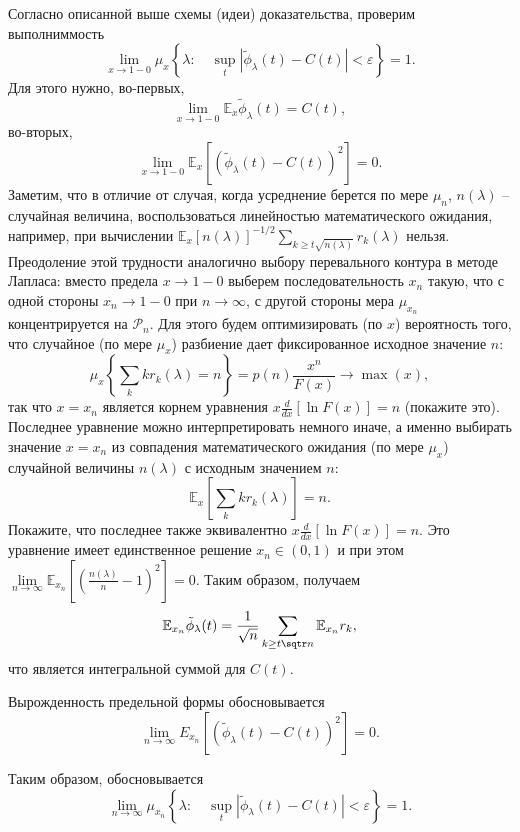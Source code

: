 \begin{problem}
\begin{ordre}
Согласно описанной выше схемы (идеи) доказательства, проверим выполниммость
$$\mathop {\lim }\limits_{x\to 1-0} \mu_{x} \left\{ {\lambda :\quad \mathop {\sup }\limits_t \left| {\tilde {\phi }_\lambda (t)-C(t)} 
\right|<\varepsilon } \right\}=1.$$
Для этого нужно, во-первых,
$$
\mathop {\lim }\limits_{x\to 1-0} \mathbb E_{x}\tilde {\phi }_\lambda (t)=C(t),
$$
во-вторых,
$$\mathop {\lim }\limits_{x\to 
1-0 } \mathbb E_{x } \left[ {\left( {\tilde {\phi }_\lambda (t)-C(t)} 
\right)^2} \right]=0.$$
Заметим, что в отличие от случая, когда усреднение берется по мере $\mu_n$, $n(\lambda)$ -- случайная величина, воспользоваться линейностью математического ожидания, например, при вычислении $\mathbb E_x [n(\lambda)]^{-1/2} \sum_{k\ge t\sqrt {n(\lambda)}} r_k(\lambda)$ нельзя. Преодоление этой трудности аналогично выбору перевального контура в методе Лапласа: вместо предела $x\to 1-0$ выберем последовательность $x_n$ такую, что с одной стороны $x_n \to 1-0$ при ${n\to\infty}$, с другой стороны мера $\mu_{x_n}$ концентрируется на  $\mathcal P_n$. Для этого будем оптимизировать (по $x$) вероятность того, что случайное (по мере $\mu_x$) разбиение дает фиксированное исходное значение $n$:
$$ \mu_{x} \left\{ \sum_k kr_k(\lambda) = n \right \} = p(n)\frac{x^n}{F(x)}\to\max(x), $$
так что  $x=x_n$ является корнем уравнения
$x\frac{d}{dx}\left[ {\ln 
F(x)} \right]=n$ (покажите это).
Последнее уравнение можно интерпретировать немного иначе, а именно выбирать значение $x=x_n$ из совпадения математического ожидания (по мере $\mu_x$) случайной величины $n(\lambda)$ с исходным значением $n$:
$$ \mathbb E_x \left[ {\sum\limits_k {kr_k (\lambda )} } 
\right]=n. $$
Покажите, что последнее также эквивалентно $x\frac{d}{dx}\left[ {\ln 
F(x)} \right]=n$. Это уравнение имеет единственное решение $x_n \in (0,1)$ и 
при этом $\mathop {\lim }\limits_{n\to \infty } \mathbb E_{x_n } \left[ {\left( 
{\frac{n(\lambda )}{n}-1} \right)^2} \right]=0$. Таким образом, получаем 
$$
\mathbb E_{x_n} \tilde {\phi }_\lambda (t) = \frac{1}{\sqrt n} \sum_{k\ge t\sqtr n} \mathbb E_{x_n} r_k,
$$
что является интегральной суммой для $C(t)$.

Вырожденность предельной формы обосновывается \[\mathop {\lim }\limits_{n\to 
\infty } E_{x_n } \left[ {\left( {\tilde {\phi }_\lambda (t)-C(t)} 
\right)^2} \right]=0.\]

Таким образом, обосновывается
$$\mathop {\lim }\limits_{n\to \infty} \mu _{x_n} \left\{ {\lambda :\quad 
\mathop {\sup }\limits_t \left| {\tilde {\phi }_\lambda (t)-C(t)} 
\right|<\varepsilon } \right\}=1.$$


\end{ordre}
\end{problem}
